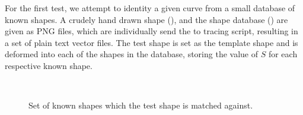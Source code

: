 \documentclass[a4paper, 12pt]{article}
\begin{document}
For the first test, we attempt to identity a given curve from a small database
of known shapes. A crudely hand drawn shape (), and the shape
database () are given as PNG files, which are individually send the
to tracing script, resulting in a set of plain text vector files. The test shape
is set as the template shape and is deformed into each of the shapes in the
database, storing the value of $S$ for each respective known shape.
\begin{figure}[!h]
  \centering
  \,
  \caption{Set of known shapes which the test shape is matched against.}
  \label{fig:shapedb}
\end{figure}
\end{document}
